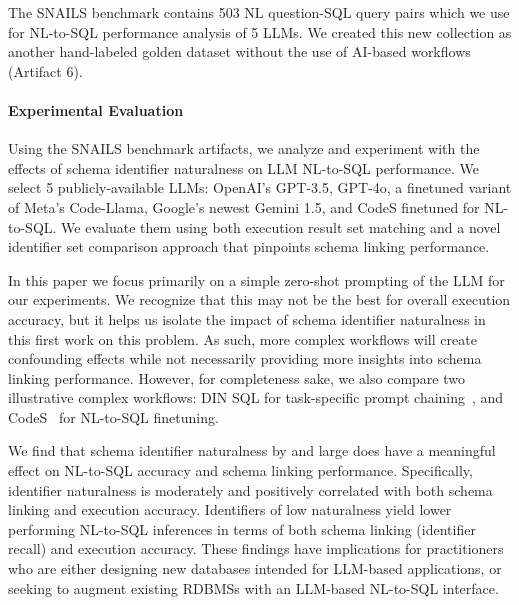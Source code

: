 The SNAILS benchmark contains 503 NL question-SQL query pairs which we use for NL-to-SQL performance analysis of 5 LLMs.
We created this new collection as another hand-labeled golden dataset without the use of AI-based workflows (Artifact 6).

\paragraph{\textbf{Experimental Evaluation}}

Using the SNAILS benchmark artifacts, we analyze and experiment with the effects of schema identifier naturalness on LLM NL-to-SQL performance.
We select 5 publicly-available LLMs: OpenAI's GPT-3.5, GPT-4o, a finetuned variant of Meta's Code-Llama, Google's newest Gemini 1.5, and CodeS finetuned for NL-to-SQL. We evaluate them using both execution result set matching and a novel identifier set comparison approach that pinpoints schema linking performance.

In this paper we focus primarily on a simple zero-shot prompting of the LLM for our experiments.
We recognize that this may not be the best for overall execution accuracy, but it helps us isolate the impact of schema identifier naturalness in this first work on this problem.
As such, more complex workflows will create confounding effects while not necessarily providing more insights into schema linking performance.
However, for completeness sake, we also compare two illustrative complex workflows: DIN SQL for task-specific prompt chaining~\cite{pourreza2023dinsql}, and CodeS~\cite{10.1145/3654930} for NL-to-SQL finetuning.

We find that schema identifier naturalness by and large does have a meaningful effect on NL-to-SQL accuracy and schema linking performance.
Specifically, identifier naturalness is moderately and positively correlated with both schema linking and execution accuracy.
Identifiers of low naturalness yield lower performing NL-to-SQL inferences in terms of both schema linking (identifier recall) and execution accuracy.
These findings have implications for practitioners who are either designing new databases intended for LLM-based applications, or seeking to augment existing RDBMSs with an LLM-based NL-to-SQL interface.

